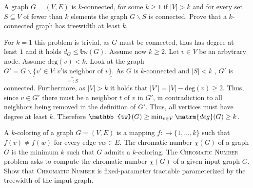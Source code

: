 \documentclass{article}
\begin{document}
\begin{exercise}
    A graph $G = (V,E)$ is $k$-connected, for some $k\geq 1$ if $|V|>k$ and for every set $S\subseteq V$ of fewer than $k$ elements the graph $G\backslash S$ is connected. Prove that a $k$-connected graph has treewidth at least $k$.
\end{exercise}
\begin{solving}
 For $k = 1$ this problem is trivial, as $G$ must be connected, thus has degree at least $1$ and it holds $d_G\leq \mathbb{tw}(G)$. 
 Assume now $k\geq 2$. Let $v\in V$ be an arbytrary node. Assume $\mathrm{deg}(v)<k$. Look at the graph $G'  = G\backslash \underbrace{\{v'\in V: v'\text{is neighbor of }v\}}_{=: S}$. As $G$ is $k$-connected and $|S|<k$ , $G'$ is connected. Furthermore, as $|V|>k$ it holds that $|V'| = |V|-\mathrm{deg}(v) \geq 2$. Thus, since $v\in G'$ there must be a neighbor $t$ of $v$ in $G'$, in contradiction to all neighbors being removed in the definition of $G'$. Thus, all vertices must have degree at least $k$. Therefore $\mathbb{tw}(G)\geq \min_{v\in V}\matrm{deg}(G)\geq k$.
\end{solving}
\newpage

\begin{exercise}
    A $k$-coloring of a graph $G= (V,E)$ is a mapping $f:\to \{1,\dots, k\}$ such that $f(v)\neq f(w)$ for every edge $vw\in E$. The chromatic number $\chi(G)$ of a graph $G$ is the minimum $k$ such that $G$ admits a $k$-coloring. The \textsc{Chromatic Number} problem asks to compute the chromatic number $\chi(G)$ of a given input graph $G$. Show that \textsc{Chromatic Number} is fixed-parameter tractable parameterized by the treewidth of the imput graph.
\end{exercise}
\newpage
\end{document}
